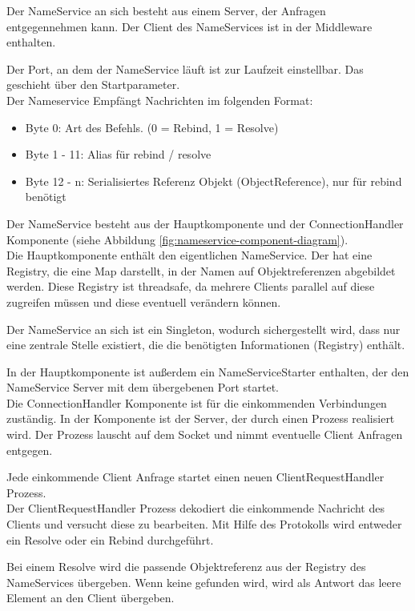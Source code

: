 \documentclass{article}
\begin{document}
Der NameService an sich besteht aus einem Server, der Anfragen entgegennehmen kann.
Der Client des NameServices ist in der Middleware enthalten.

Der Port, an dem der NameService läuft ist zur Laufzeit einstellbar. Das geschieht über den Startparameter.\\

Der Nameservice Empfängt Nachrichten im folgenden Format:
\begin{itemize}
\item Byte 0: Art des Befehls. (0 = Rebind, 1 = Resolve)
\item Byte 1 - 11: Alias für rebind / resolve
\item Byte 12 - n: Serialisiertes Referenz Objekt (ObjectReference), nur für rebind benötigt
\end{itemize}

Der NameService besteht aus der Hauptkomponente und der ConnectionHandler Komponente (siehe Abbildung
\ref{fig:nameservice-component-diagram}).\\

Die Hauptkomponente enthält den eigentlichen NameService. Der hat eine Registry, die eine Map darstellt, in der Namen
auf Objektreferenzen abgebildet werden. Diese Registry ist threadsafe, da mehrere Clients parallel auf diese
zugreifen müssen und diese eventuell verändern können.

Der NameService an sich ist ein Singleton, wodurch sichergestellt wird, dass nur eine zentrale Stelle existiert, die
die benötigten Informationen (Registry) enthält.

In der Hauptkomponente ist außerdem ein NameServiceStarter enthalten, der den NameService Server mit dem übergebenen
Port startet.\\

Die ConnectionHandler Komponente ist für die einkommenden Verbindungen zuständig. In der Komponente ist der Server, der
durch einen Prozess realisiert wird. Der Prozess lauscht auf dem Socket und nimmt eventuelle Client Anfragen entgegen.

Jede einkommende Client Anfrage startet einen neuen ClientRequestHandler Prozess.\\

Der ClientRequestHandler Prozess dekodiert die einkommende Nachricht des Clients und versucht diese zu bearbeiten.
Mit Hilfe des Protokolls wird entweder ein Resolve oder ein Rebind durchgeführt.

Bei einem Resolve wird die passende Objektreferenz aus der Registry des NameServices übergeben. Wenn keine gefunden
wird, wird als Antwort das leere Element an den Client übergeben.
\end{document}
